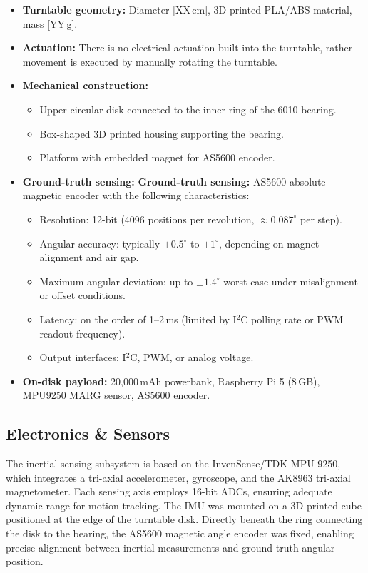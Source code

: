 \documentclass{iutbscthesis}
\begin{document}
\begin{itemize}
    \item \textbf{Turntable geometry:} Diameter [XX\,cm], 3D printed PLA/ABS material, mass [YY\,g].
    \item \textbf{Actuation:} There is no electrical actuation built into the turntable, rather movement is executed by manually rotating the turntable.
    \item \textbf{Mechanical construction:} 
    \begin{itemize}
        \item Upper circular disk connected to the inner ring of the 6010 bearing.
        \item Box-shaped 3D printed housing supporting the bearing.
        \item Platform with embedded magnet for AS5600 encoder.
    \end{itemize}
    \item \textbf{Ground-truth sensing:} \textbf{Ground-truth sensing:} AS5600 absolute magnetic encoder with the following characteristics:
        \begin{itemize}
        \item Resolution: 12-bit (4096 positions per revolution, $\approx 0.087^{\circ}$ per step).
        \item Angular accuracy: typically $\pm 0.5^{\circ}$ to $\pm 1^{\circ}$, depending on magnet alignment and air gap.
        \item Maximum angular deviation: up to $\pm 1.4^{\circ}$ worst-case under misalignment or offset conditions.
        \item Latency: on the order of 1–2\,ms (limited by I$^2$C polling rate or PWM readout frequency).
        \item Output interfaces: I$^2$C, PWM, or analog voltage.
        \end{itemize}    \item \textbf{On-disk payload:} 20,000\,mAh powerbank, Raspberry Pi 5 (8\,GB), MPU9250 MARG sensor, AS5600 encoder.
\end{itemize}


\subsection{Electronics \& Sensors}
The inertial sensing subsystem is based on the InvenSense/TDK MPU-9250, which integrates a tri-axial accelerometer, gyroscope, and the AK8963 tri-axial magnetometer. Each sensing axis employs 16-bit ADCs, ensuring adequate dynamic range for motion tracking. The IMU was mounted on a 3D-printed cube positioned at the edge of the turntable disk. Directly beneath the ring connecting the disk to the bearing, the AS5600 magnetic angle encoder was fixed, enabling precise alignment between inertial measurements and ground-truth angular position.
\end{document}
